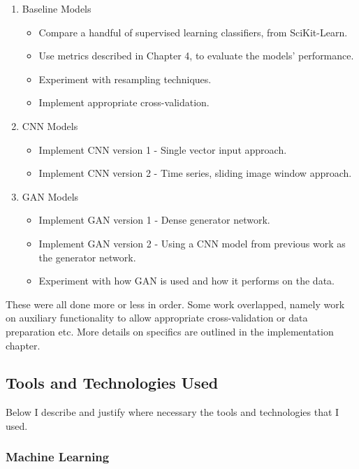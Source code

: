 \documentclass[12pt,a4paper,twoside]{report}
\begin{document}
\begin{enumerate}
   \item Baseline Models
   \begin{itemize}
     \item Compare a handful of supervised learning classifiers, from SciKit-Learn.
     \item Use metrics described in Chapter 4, to evaluate the models' performance.
     \item Experiment with resampling techniques. 
     \item Implement appropriate cross-validation.
   \end{itemize}
   \item CNN Models
   \begin{itemize}
     \item Implement CNN version 1 - Single vector input approach.
     \item Implement CNN version 2 - Time series, sliding image window approach.
   \end{itemize}
   \item GAN Models
   \begin{itemize}
     \item Implement GAN version 1 - Dense generator network.
     \item Implement GAN version 2 - Using a CNN model from previous work as the generator network.
     \item Experiment with how GAN is used and how it performs on the data.
   \end{itemize}
\end{enumerate}

 These were all done more or less in order. Some work overlapped, namely work on auxiliary functionality to allow appropriate cross-validation or data preparation etc. More details on specifics are outlined in the implementation chapter. 
  
\subsection{Tools and Technologies Used} \label{tools}

Below I describe and justify where necessary the tools and technologies that I used.

\subsubsection{Machine Learning}
\end{document}
